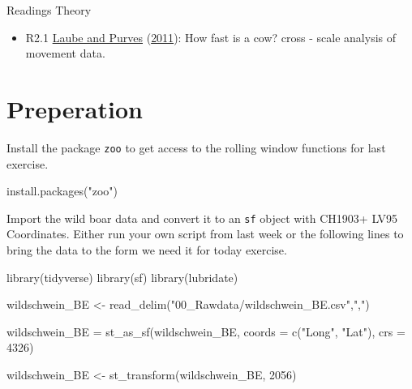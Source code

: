 \documentclass[
]{book}
\newenvironment{Shaded}{\begin{snugshade}}{\end{snugshade}}
\newcommand{\AttributeTok}[1]{\textcolor[rgb]{0.77,0.63,0.00}{#1}}
\newcommand{\DecValTok}[1]{\textcolor[rgb]{0.00,0.00,0.81}{#1}}
\newcommand{\FunctionTok}[1]{\textcolor[rgb]{0.00,0.00,0.00}{#1}}
\newcommand{\NormalTok}[1]{#1}
\newcommand{\OtherTok}[1]{\textcolor[rgb]{0.56,0.35,0.01}{#1}}
\newcommand{\StringTok}[1]{\textcolor[rgb]{0.31,0.60,0.02}{#1}}
\providecommand{\tightlist}{%
  \setlength{\itemsep}{0pt}\setlength{\parskip}{0pt}}
\begin{document}
Readings Theory

\begin{itemize}
\tightlist
\item
  R2.1 \protect\hyperlink{ref-laube2011}{Laube and Purves} (\protect\hyperlink{ref-laube2011}{2011}): How fast is a cow? cross - scale analysis of movement data.
\end{itemize}

\hypertarget{preperation-1}{%
\section{Preperation}\label{preperation-1}}

Install the package \texttt{zoo} to get access to the rolling window functions for last exercise.

\begin{Shaded}
\begin{Highlighting}[]
\FunctionTok{install.packages}\NormalTok{(}\StringTok{"zoo"}\NormalTok{)}
\end{Highlighting}
\end{Shaded}

Import the wild boar data and convert it to an \texttt{sf} object with CH1903+ LV95 Coordinates. Either run your own script from last week or the following lines to bring the data to the form we need it for today exercise.

\begin{Shaded}
\begin{Highlighting}[]
\FunctionTok{library}\NormalTok{(tidyverse)}
\FunctionTok{library}\NormalTok{(sf)}
\FunctionTok{library}\NormalTok{(lubridate)}

\NormalTok{wildschwein\_BE }\OtherTok{\textless{}{-}} \FunctionTok{read\_delim}\NormalTok{(}\StringTok{"00\_Rawdata/wildschwein\_BE.csv"}\NormalTok{,}\StringTok{","}\NormalTok{)}

\NormalTok{wildschwein\_BE }\OtherTok{=} \FunctionTok{st\_as\_sf}\NormalTok{(wildschwein\_BE, }
                          \AttributeTok{coords =} \FunctionTok{c}\NormalTok{(}\StringTok{"Long"}\NormalTok{, }\StringTok{"Lat"}\NormalTok{), }
                          \AttributeTok{crs =} \DecValTok{4326}\NormalTok{)}

\NormalTok{wildschwein\_BE }\OtherTok{\textless{}{-}} \FunctionTok{st\_transform}\NormalTok{(wildschwein\_BE, }\DecValTok{2056}\NormalTok{)}
\end{Highlighting}
\end{Shaded}
\end{document}
